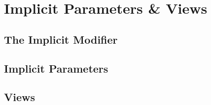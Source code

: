 
\chapter{Implicit Parameters \& Views}

\section{The Implicit Modifier}

\section{Implicit Parameters}
\label{sec:implicit-parameters}

\section{Views}

